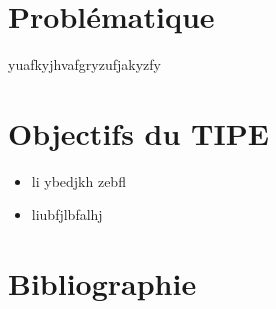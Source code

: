 \documentclass[12pt,a4paper]{extarticle}
\begin{document}
\section*{Problématique}

\indent yuafkyjhvafgryzufjakyzfy

\section*{Objectifs du TIPE}

\begin{itemize}

\item li	ybedjkh	zebfl
\item liubfjlbfalhj

\end{itemize}

\section*{Bibliographie}
\printbibliography
\end{document}
